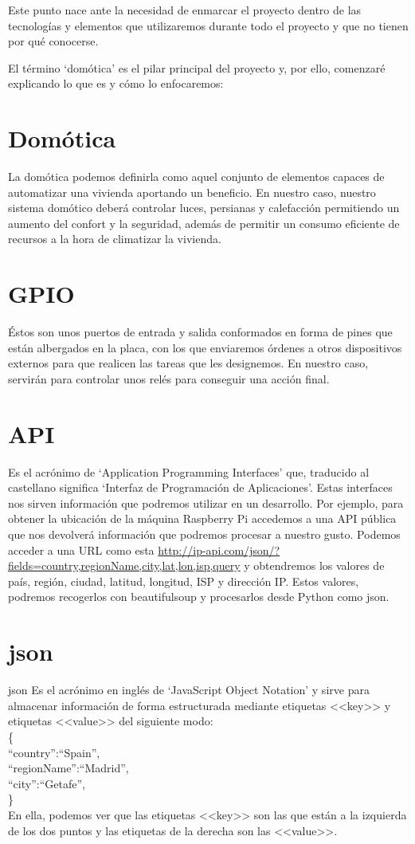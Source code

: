 
Este punto nace ante la necesidad de enmarcar el proyecto dentro de las tecnologías y elementos que utilizaremos durante todo el proyecto y que no tienen por qué conocerse.

El término ‘domótica’ es el pilar principal del proyecto y, por ello, comenzaré explicando lo que es y cómo lo enfocaremos:

\section{Domótica}
La domótica podemos definirla como aquel conjunto de elementos capaces de automatizar una vivienda aportando un beneficio.
En nuestro caso, nuestro sistema domótico deberá controlar luces, persianas y calefacción permitiendo un aumento del confort y la seguridad, además de permitir un consumo eficiente de recursos a la hora de climatizar la vivienda.

\section{GPIO}
Éstos son unos puertos de entrada y salida conformados en forma de pines que están albergados en la placa, con los que enviaremos órdenes a otros dispositivos externos para que realicen las tareas que les designemos. En nuestro caso, servirán para controlar unos relés para conseguir una acción final.

\section{API}
Es el acrónimo de ‘Application Programming Interfaces’ que, traducido al castellano significa ‘Interfaz de Programación de Aplicaciones’. Estas interfaces nos sirven información que podremos utilizar en un desarrollo.
Por ejemplo, para obtener la ubicación de la máquina Raspberry Pi accedemos a una API pública que nos devolverá información que podremos procesar a nuestro gusto.
Podemos acceder a una URL como esta  \url{http://ip-api.com/json/?fields=country,regionName,city,lat,lon,isp,query} y obtendremos los valores de país, región, ciudad, latitud, longitud, ISP y dirección IP.
Estos valores, podremos recogerlos con beautifulsoup y procesarlos desde Python como json.

\section{json}{json\cite{misc:Json}}
Es el acrónimo en inglés de ‘JavaScript Object Notation’ y sirve para almacenar información de forma estructurada mediante etiquetas <<key>> y etiquetas <<value>> del siguiente modo: \\
\{\\``country'':``Spain'',\\ ``regionName'':``Madrid'',\\ ``city'':``Getafe'',\\\}\\
En ella, podemos ver que las etiquetas <<key>> son las que están a la izquierda de los dos puntos y las etiquetas de la derecha son las <<value>>.

